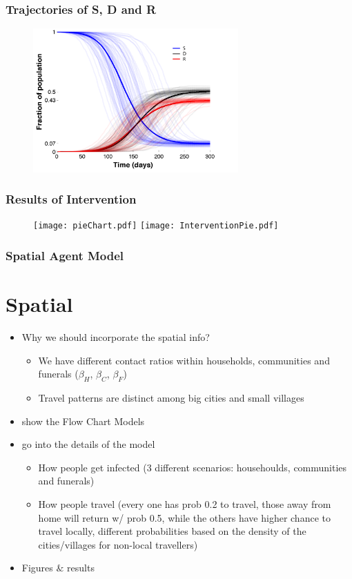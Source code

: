 \documentclass[30pt]{beamer}
\begin{document}
\begin{frame}
\frametitle{Trajectories of S, D and R}
\begin{figure}
\includegraphics[width = 0.7\textwidth]{SDRcurves.pdf}
\end{figure}
\end{frame}



\begin{frame}
\frametitle{Results of Intervention}
\begin{figure}
\texttt{[image: pieChart.pdf]}
\texttt{[image: InterventionPie.pdf]}
\end{figure}
\end{frame}



\begin{frame}
\frametitle{Spatial Agent Model}
\section{Spatial}
\begin{itemize}
\item Why we should incorporate the spatial info?
\begin{itemize}
\item We have different contact ratios within households, communities and funerals ($\beta_H$, $\beta_C$, $\beta_F$)
\item Travel patterns are distinct among big cities and small villages
\end{itemize}
\item show the Flow Chart Models
\item go into the details of the model
\begin{itemize}
\item How people get infected (3 different scenarios: househoulds, communities and funerals)
\item How people travel (every one has prob 0.2 to travel, those away from home will return w/ prob 0.5, while the others have higher chance to travel locally, different probabilities based on the density of the cities/villages for non-local travellers)
\end{itemize}
\item Figures $\&$ results
\end{itemize}

\end{frame}
\end{document}
